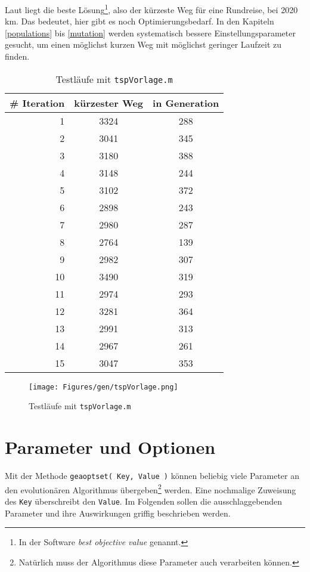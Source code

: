 Laut \cite{aufg} liegt die beste
Lösung\footnote{In der Software \emph{best objective value} genannt.},
also der kürzeste Weg für eine Rundreise, bei 2020 km.
Das bedeutet, hier gibt es noch Optimierungsbedarf.
In den Kapiteln \ref{populations} bis \ref{mutation} werden systematisch bessere Einstellungsparameter
gesucht, um einen möglichst kurzen Weg mit möglichst geringer Laufzeit zu finden.

\begin{table}[h]
\begin{tabular}{ | r | c | c | }
  \hline
  \# Iteration & kürzester Weg & in Generation \\
  \hline
  1  & 3324 & 288 \\
  2  & 3041 & 345 \\
  3  & 3180 & 388 \\
  4  & 3148 & 244 \\
  5  & 3102 & 372 \\
  6  & 2898 & 243 \\
  7  & 2980 & 287 \\
  8  & 2764 & 139 \\
  9  & 2982 & 307 \\
  10 & 3490 & 319 \\
  11 & 2974 & 293 \\
  12 & 3281 & 364 \\
  13 & 2991 & 313 \\
  14 & 2967 & 261 \\
  15 & 3047 & 353 \\
  \hline
\end{tabular}
\caption{Testläufe mit {\tt tspVorlage.m}}\label{testlaeufe}
\end{table}

\begin{figure}[h!]
  \centering
  \texttt{[image: Figures/gen/tspVorlage.png]}
  \caption{Testläufe mit {\tt tspVorlage.m}}\label{fig.testlaeufe}
\end{figure}


\section{Parameter und Optionen}\label{sec.param}

Mit der Methode {\tt geaoptset( Key, Value )} können beliebig viele
Parameter an den evolutionären Algorithmus übergeben\footnote{Natürlich
muss der Algorithmus diese Parameter auch verarbeiten können.} werden.
Eine nochmalige Zuweisung des {\tt Key} überschreibt den {\tt Value}.
Im Folgenden sollen die ausschlaggebenden Parameter und
ihre Auswirkungen griffig beschrieben werden.

